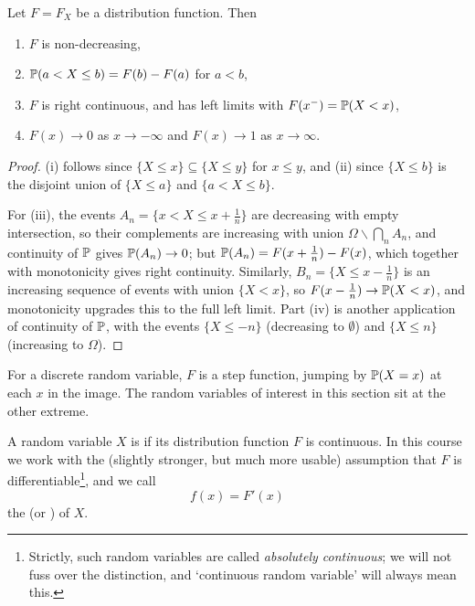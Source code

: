\documentclass[a4paper]{scrartcl}
\begin{document}
\begin{proposition}
	Let $F = F_X$ be a distribution function. Then
	\begin{enumerate}[label=(\roman*)]
		\item $F$ is non-decreasing,
		\item $\mathbb{P}(a < X \leq b) = F(b) - F(a)$ for $a < b$,
		\item $F$ is right continuous, and has left limits with $F(x^-) = \mathbb{P}(X < x)$,
		\item $F(x) \rightarrow 0$ as $x \rightarrow -\infty$ and $F(x) \rightarrow 1$ as $x \rightarrow \infty$.
	\end{enumerate}
\end{proposition}
\begin{proof}
	(i) follows since $\{X \leq x\} \subseteq \{X \leq y\}$ for $x \leq y$, and (ii) since $\{X \leq b\}$ is the disjoint union of $\{X \leq a\}$ and $\{a < X \leq b\}$.

	For (iii), the events $A_n = \{x < X \leq x + \frac{1}{n}\}$ are decreasing with empty intersection, so their complements are increasing with union $\Omega \backslash \bigcap_n A_n$, and continuity of $\mathbb{P}$ gives $\mathbb{P}(A_n) \rightarrow 0$; but $\mathbb{P}(A_n) = F(x + \frac1n) - F(x)$, which together with monotonicity gives right continuity. Similarly, $B_n = \{X \leq x - \frac1n\}$ is an increasing sequence of events with union $\{X < x\}$, so $F(x - \frac1n) \rightarrow \mathbb{P}(X < x)$, and monotonicity upgrades this to the full left limit. Part (iv) is another application of continuity of $\mathbb{P}$, with the events $\{X \leq -n\}$ (decreasing to $\emptyset$) and $\{X \leq n\}$ (increasing to $\Omega$).
\end{proof}

For a discrete random variable, $F$ is a step function, jumping by $\mathbb{P}(X = x)$ at each $x$ in the image. The random variables of interest in this section sit at the other extreme.

\begin{definition}
	A random variable $X$ is  if its distribution function $F$ is continuous. In this course we work with the (slightly stronger, but much more usable) assumption that $F$ is differentiable\footnote{Strictly, such random variables are called \emph{absolutely continuous}; we will not fuss over the distinction, and `continuous random variable' will always mean this.}, and we call
	$$
	f(x) = F'(x)
	$$
	the  (or ) of $X$.
\end{definition}
\end{document}
